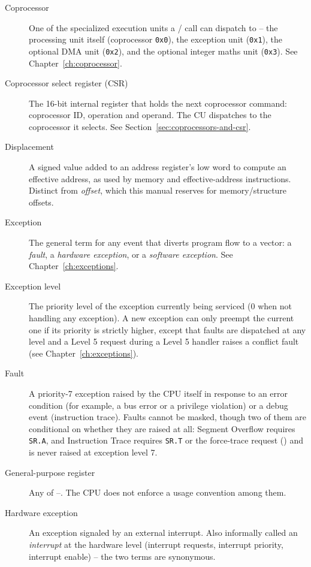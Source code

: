 \begin{description}
	\item[Coprocessor] One of the specialized execution units a / call can dispatch to -- the
	      processing unit itself (coprocessor \texttt{0x0}), the exception unit (\texttt{0x1}), the optional DMA unit
	      (\texttt{0x2}), and the optional integer maths unit (\texttt{0x3}). See Chapter~\ref{ch:coprocessor}.
	\item[Coprocessor select register (CSR)] The 16-bit internal register that holds the next coprocessor command: coprocessor
	      ID, operation and operand. The CU dispatches to the coprocessor it selects. See Section~\ref{sec:coprocessors-and-csr}.
	\item[Displacement] A signed value added to an address register's low word to compute an effective address, as used by memory
	      and effective-address instructions. Distinct from \textit{offset}, which this manual reserves for memory/structure
	      offsets.
	\item[Exception] The general term for any event that diverts program flow to a vector: a \textit{fault}, a \textit{hardware
		      exception}, or a \textit{software exception}. See Chapter~\ref{ch:exceptions}.
	\item[Exception level] The priority level of the exception currently being serviced (0 when not handling any exception). A
	      new exception can only preempt the current one if its priority is strictly higher, except that faults are dispatched at
	      any level and a Level 5 request during a Level 5 handler raises a conflict fault (see Chapter~\ref{ch:exceptions}).
	\item[Fault] A priority-7 exception raised by the CPU itself in response to an error condition (for example, a bus error or a
	      privilege violation) or a debug event (instruction trace). Faults cannot be masked, though two of them are conditional
	      on whether they are raised at all: Segment Overflow requires \texttt{SR.A}, and Instruction Trace requires
	      \texttt{SR.T} or the force-trace request () and is never raised at exception level 7.
	\item[General-purpose register] Any of --. The CPU does not enforce a usage convention among them.
	\item[Hardware exception] An exception signaled by an external interrupt. Also informally called an \textit{interrupt} at the
	      hardware level (interrupt requests, interrupt priority, interrupt enable) -- the two terms are synonymous.

\end{description}

